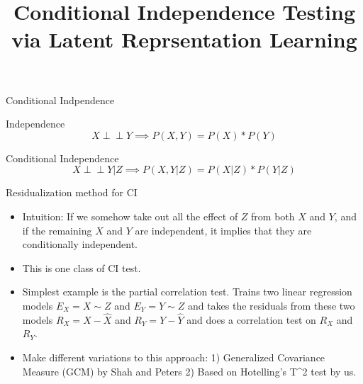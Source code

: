 \documentclass{beamer}
\def\ci{\perp\!\!\!\!\!\perp}
\begin{document}
\title[]{Conditional Independence Testing via Latent Reprsentation Learning}
\author {}
\date{}

\maketitle
\begin{frame}{Conditional Indpendence}
	\begin{block}{Independence}
		$$ X \ci Y \implies P(X, Y) = P(X) * P(Y) $$	
	\end{block}
	\begin{block}{Conditional Independence}
		$$ X \ci Y | Z  \implies P(X, Y | Z) = P(X | Z ) *  P(Y | Z) $$
	\end{block}
\end{frame}
\begin{frame}{Residualization method for CI}
	\begin{itemize}
		\item Intuition: If we somehow take out all the effect of $ Z $
			from both $ X $ and $ Y $, and if the remaining $ X $
			and $ Y $ are independent, it implies that they are
			conditionally independent.
		\item This is one class of CI test.
		\item Simplest example is the partial correlation test. Trains
			two linear regression models $ E_X = X \sim Z $ and $
			E_Y = Y \sim Z $ and takes the residuals from these two models 
			$ R_X = X - \hat{X} $ and $ R_Y = Y - \hat{Y} $ and does a
			correlation test on $ R_X $ and $ R_Y $.
		\item Make different variations to this approach:
			1) Generalized Covariance Measure (GCM) by Shah and Peters
			2) Based on Hotelling's T^2 test by us.
	\end{itemize}
\end{frame}
\end{document}
